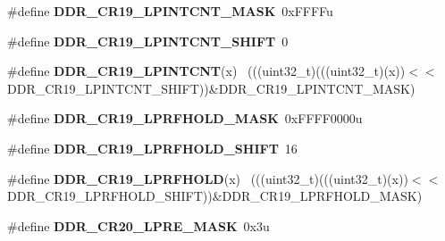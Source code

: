 \begin{DoxyCompactItemize}
\item 
\hypertarget{group___d_d_r___register___masks_gab69b6e53d34ef3f085654530c0a32244}{}\#define {\bfseries D\+D\+R\+\_\+\+C\+R19\+\_\+\+L\+P\+I\+N\+T\+C\+N\+T\+\_\+\+M\+A\+S\+K}~0x\+F\+F\+F\+Fu\label{group___d_d_r___register___masks_gab69b6e53d34ef3f085654530c0a32244}

\item 
\hypertarget{group___d_d_r___register___masks_ga93309d66d1d6bb4447c992a8312a4432}{}\#define {\bfseries D\+D\+R\+\_\+\+C\+R19\+\_\+\+L\+P\+I\+N\+T\+C\+N\+T\+\_\+\+S\+H\+I\+F\+T}~0\label{group___d_d_r___register___masks_ga93309d66d1d6bb4447c992a8312a4432}

\item 
\hypertarget{group___d_d_r___register___masks_ga8b2a793485f0671b579cafe7f6715ce4}{}\#define {\bfseries D\+D\+R\+\_\+\+C\+R19\+\_\+\+L\+P\+I\+N\+T\+C\+N\+T}(x)                                      ~(((uint32\+\_\+t)(((uint32\+\_\+t)(x))$<$$<$D\+D\+R\+\_\+\+C\+R19\+\_\+\+L\+P\+I\+N\+T\+C\+N\+T\+\_\+\+S\+H\+I\+F\+T))\&D\+D\+R\+\_\+\+C\+R19\+\_\+\+L\+P\+I\+N\+T\+C\+N\+T\+\_\+\+M\+A\+S\+K)\label{group___d_d_r___register___masks_ga8b2a793485f0671b579cafe7f6715ce4}

\item 
\hypertarget{group___d_d_r___register___masks_ga9b0214dd2f4428d7863a3d134a6858a3}{}\#define {\bfseries D\+D\+R\+\_\+\+C\+R19\+\_\+\+L\+P\+R\+F\+H\+O\+L\+D\+\_\+\+M\+A\+S\+K}~0x\+F\+F\+F\+F0000u\label{group___d_d_r___register___masks_ga9b0214dd2f4428d7863a3d134a6858a3}

\item 
\hypertarget{group___d_d_r___register___masks_ga701c5f8885ba7a37d182997dad825bf3}{}\#define {\bfseries D\+D\+R\+\_\+\+C\+R19\+\_\+\+L\+P\+R\+F\+H\+O\+L\+D\+\_\+\+S\+H\+I\+F\+T}~16\label{group___d_d_r___register___masks_ga701c5f8885ba7a37d182997dad825bf3}

\item 
\hypertarget{group___d_d_r___register___masks_ga82db8af0b44e1ee62357fec51892d676}{}\#define {\bfseries D\+D\+R\+\_\+\+C\+R19\+\_\+\+L\+P\+R\+F\+H\+O\+L\+D}(x)                                      ~(((uint32\+\_\+t)(((uint32\+\_\+t)(x))$<$$<$D\+D\+R\+\_\+\+C\+R19\+\_\+\+L\+P\+R\+F\+H\+O\+L\+D\+\_\+\+S\+H\+I\+F\+T))\&D\+D\+R\+\_\+\+C\+R19\+\_\+\+L\+P\+R\+F\+H\+O\+L\+D\+\_\+\+M\+A\+S\+K)\label{group___d_d_r___register___masks_ga82db8af0b44e1ee62357fec51892d676}

\item 
\hypertarget{group___d_d_r___register___masks_ga06ecd21caf0396f107bfe985fc164c52}{}\#define {\bfseries D\+D\+R\+\_\+\+C\+R20\+\_\+\+L\+P\+R\+E\+\_\+\+M\+A\+S\+K}~0x3u\label{group___d_d_r___register___masks_ga06ecd21caf0396f107bfe985fc164c52}


\end{DoxyCompactItemize}
